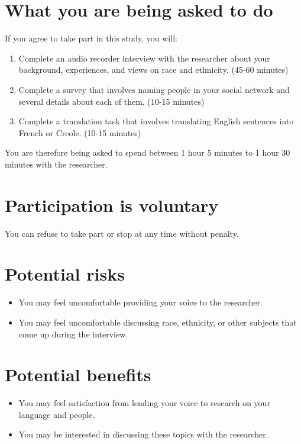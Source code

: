 \documentclass{article}
\begin{document}
    \section{What you are being asked to do}
      If you agree to take part in this study, you will:
      \begin{enumerate}
        \item Complete an audio recorder interview with the researcher about your background, experiences, and views on race and ethnicity. (45-60 minutes)
        \item Complete a survey that involves naming people in your social network and several details about each of them. (10-15 minutes)
        \item Complete a translation task that involves translating English sentences into French or Creole. (10-15 minutes)
      \end{enumerate}
      You are therefore being asked to spend between 1 hour 5 minutes to 1 hour 30 minutes with the researcher.

    \section{Participation is voluntary}
      You can refuse to take part or stop at any time without penalty.

    \section{Potential risks}
       \begin{itemize}
         \item You may feel uncomfortable providing your voice to the researcher.
         \item You may feel uncomfortable discussing race, ethnicity, or other subjects that come up during the interview.
       \end{itemize}

    \section{Potential benefits}
      \begin{itemize}
        \item You may feel satisfaction from lending your voice to research on your language and people.
        \item You may be interested in discussing these topics with the researcher.
      \end{itemize}
\end{document}
